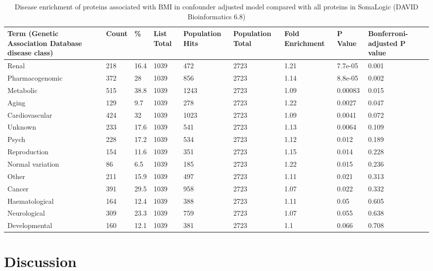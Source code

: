 \documentclass[11pt,twoside]{bristolthesis}
\begin{document}
\begin{landscape}\begin{table}

\caption{\label{tab:DAVID-enrichment-obs}Disease enrichment of proteins associated with BMI in confounder adjusted model compared with all proteins in SomaLogic (DAVID Bioinformatics 6.8)}
\centering
\begin{tabu} to 
\toprule
Term (Genetic Association Database disease class) & Count & \% & List Total &   Population Hits & Population Total & Fold Enrichment & P Value & Bonferroni-adjusted P value\\
\midrule
Renal & 218 & 16.4 & 1039 & 472 & 2723 & 1.21 & 7.7e-05 & 0.001\\
Pharmacogenomic & 372 & 28 & 1039 & 856 & 2723 & 1.14 & 8.8e-05 & 0.002\\
Metabolic & 515 & 38.8 & 1039 & 1243 & 2723 & 1.09 & 0.00083 & 0.015\\
Aging & 129 & 9.7 & 1039 & 278 & 2723 & 1.22 & 0.0027 & 0.047\\
Cardiovascular & 424 & 32 & 1039 & 1023 & 2723 & 1.09 & 0.0041 & 0.072\\
\addlinespace
Unknown & 233 & 17.6 & 1039 & 541 & 2723 & 1.13 & 0.0064 & 0.109\\
Psych & 228 & 17.2 & 1039 & 534 & 2723 & 1.12 & 0.012 & 0.189\\
Reproduction & 154 & 11.6 & 1039 & 351 & 2723 & 1.15 & 0.014 & 0.228\\
Normal variation & 86 & 6.5 & 1039 & 185 & 2723 & 1.22 & 0.015 & 0.236\\
Other & 211 & 15.9 & 1039 & 497 & 2723 & 1.11 & 0.021 & 0.313\\
\addlinespace
Cancer & 391 & 29.5 & 1039 & 958 & 2723 & 1.07 & 0.022 & 0.332\\
Haematological & 164 & 12.4 & 1039 & 388 & 2723 & 1.11 & 0.05 & 0.605\\
Neurological & 309 & 23.3 & 1039 & 759 & 2723 & 1.07 & 0.055 & 0.638\\
Developmental & 160 & 12.1 & 1039 & 381 & 2723 & 1.1 & 0.066 & 0.708\\
\bottomrule
\end{tabu}
\end{table}
\end{landscape}
\hypertarget{discussion-3}{%
\section{Discussion}\label{discussion-3}}
\end{document}

